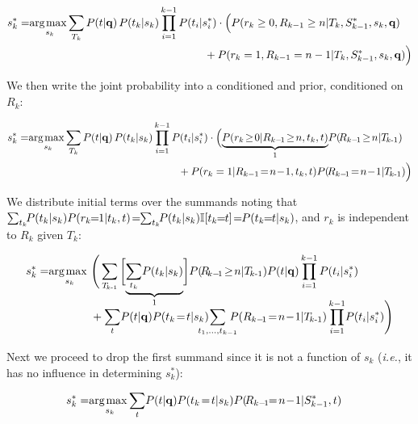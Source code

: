 \begin{align}
 s_k^* = & \argmax_{s_k} \!\sum_{T_k} P(t|\vec{q}) \,P(t_k|s_k) \prod_{i=1}^{k-1} P(t_i|s_i^*) \cdot \Bigl( P(r_k\geq 0, R_{k-1}\geq n|T_k,S_{k-1}^*,s_k,\vec{q}) \nonumber \\
  & \hspace{56mm} + P(r_k = 1, R_{k-1} = n-1|T_k,S_{k-1}^*,s_k,\vec{q}) \Big) \nonumber 
\end{align}

We then write the joint probability into a conditioned and prior, conditioned on $R_k$:

\begin{align}
 s_k^* = & \argmax_{s_k} \!\sum_{T_k} P(t|\vec{q}) \,P(t_k|s_k) \prod_{i=1}^{k-1} P(t_i|s_i^*) \cdot \Bigl( \mbox{$\underbrace{P(r_k\!\geq\!0|R_{k-\!1}\!\geq\!n,t_k,t)}_{1}$} P(\!R_{k-\!1}\!\geq\!n|\TlessK) \nonumber \\
  & \hspace{50mm} + P(r_k=1|R_{k-1}\!=\!n\!-\!1,t_k,t) P(\!R_{k-\!1}\!=\!n\!-\!1|\TlessK) \Big) \nonumber 
\end{align}

We distribute initial terms over the summands noting that 
$\sum_{t_k} \!\! P(t_k|s_k) P(r_k\!\!=\!\!1|t_k,t) \! = \!\! \sum_{t_k} \!\! P(t_k|s_k) \I[t_k\!\!=\!\!t] \! = \!\! P(t_k\!\!=\!\!t|s_k)$,
and $r_k$ is independent to $R_k$ given $T_k$:

\begin{align}
 s_k^* = & \argmax_{s_k} \Bigg( \sum_{\TlessK} \bigg[ \mbox{$\underbrace{ \sum_{t_k} \!P(t_k|s_k) }_{1}$} \bigg] P(\!R_{\!k-\!1}\!\geq\!n|\TlessK) P(t|\vec{q}) \prod_{i=1}^{k-1} P(t_i|s_i^*) \nonumber \\[-3.5mm]
  & \hspace{13mm} + \sum_{t} \!P(t|\vec{q}) P(t_k\!=\!t|s_k) \hspace{-4mm} \sum_{t_1, \dots, t_{k-1}} \hspace{-3mm} P(R_{k-\!1}\!=\!n\!-\!1|\TlessK) \prod_{i=1}^{k-1} \!P(t_i|s_i^*) \Bigg) \nonumber
\end{align}

Next we proceed to drop the first summand since it is not a function of $s_k$ (\emph{i.e.},
it has no influence in determining $s_k^*$):

\begin{align}
s_k^* = & \argmax_{s_k} \!\sum_{t} \!P(t|\vec{q}) P(t_k\!=\!t|s_k) P(\!R_{k-\!1}\!\!=\!n\!-\!1|S_{k-1}^*, t) \label{eq.ncall}
\end{align}

